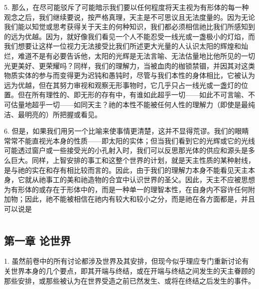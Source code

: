 5. 那么，在尽可能驳斥了可能暗示我们要以任何程度将天主视为有形体的每一种观念之后，我们继续要说，按严格真理，天主是不可思议且无法度量的。因为无论我们能以知觉或思考获得关于天主的何种知识，我们都必须相信祂比我们所感知到的远为优越。因为，就好像我们看见一个人不能忍受一线光或一盏极小的灯焰，而我们想要让这样一位视力无法接受比我们所述更大光量的人认识太阳的辉煌和灿烂，难道不是有必要告诉他，太阳的光辉是无法言喻、无法估量地比他所见的一切光更美好、更荣耀吗？同样，我们的理解力，当被血肉的枷锁禁锢，并因其对这类物质实体的参与而变得更为迟钝和愚钝时，尽管与我们本性的身体相比，它被认为远为优越，但在其努力审视和观察无形事物时，它几乎只占一线光或一盏灯的位置。但在所有理性的、即无形的存有中，有谁如此超乎一切——如此不可言喻、不可估量地超乎一切——如同天主？祂的本性不能被任何人性的理解力（即使是最纯洁、最明亮的）所把握或看见。\par

6. 但是，如果我们用另一个比喻来使事情更清楚，这并不显得荒谬。我们的眼睛常常不能直视光本身的性质——即太阳的实体；但当我们看到它的光辉或它的光线可能透过窗户或一些接受光的小孔射入时，我们可以反思那光体的供应和源头是多么巨大。同样，上智安排的事工和这整个世界的计划，就是天主性质的某种射线，是与祂的实在和存有相比较而言的。因此，由于我们的理解力本身不能看见天主本身，它就从祂事工的美和祂造物的合宜中认识世界的圣父。因此，天主不应被思想为有形体的或存在于形体中的，而是一种单一的理智本性，在自身内不容许任何附加物；因此，祂不能被相信在祂内有较大和较小之分，而是祂在各方面都是，并且可以说是\par



\section{}


\subsection{第一章 论世界}

1. 虽然前卷中的所有讨论都涉及世界及其安排，但现今似乎理应专门重新讨论有关世界本身的几个要点，即其开端与终结，或在开端与终结之间发生的天主眷顾的那些安排，或那些被认为在世界受造之前已然发生、或将在终结之后发生的事件。\par

